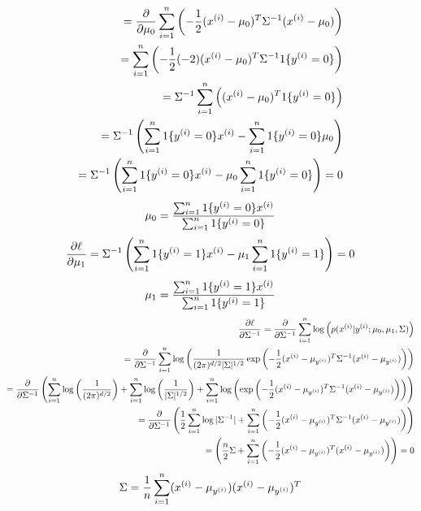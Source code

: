 \begin{answer}
\begin{eqnarray*}
=\frac{\partial}{\partial\mu_{0}}\sum_{i=1}^{n} \left(-\frac{1}{2}(x^{(i)}-\mu_{0})^T \Sigma^{-1} (x^{(i)}-\mu_{0})\right) \\
=\sum_{i=1}^{n} \left(-\frac{1}{2}(-2)(x^{(i)}-\mu_{0})^T \Sigma^{-1}1\{y^{(i)} = 0\}\right) \\
=\Sigma^{-1}\sum_{i=1}^{n} \left((x^{(i)}-\mu_{0})^T 1\{y^{(i)} = 0\}\right) \\
=\Sigma^{-1}\left(\sum_{i=1}^{n}  1\{y^{(i)} = 0\}x^{(i)}-\sum_{i=1}^{n} 1\{y^{(i)} = 0\}\mu_{0}\right) \\
=\Sigma^{-1}\left(\sum_{i=1}^{n} 1\{y^{(i)} = 0\}x^{(i)}-\mu_{0}\sum_{i=1}^{n} 1\{y^{(i)} = 0\}\right)=0
  \end{eqnarray*}
  \begin{eqnarray*}
\mu_0=\frac{\sum_{i=1}^{n} 1\{y^{(i)} = {0}\} x^{(i)}}{\sum_{i=1}^{n}1\{y^{(i)} = {0}\}}
  \end{eqnarray*}
  \begin{eqnarray*}
\frac{\partial\ell}{\partial\mu_{1}}=\Sigma^{-1}\left(\sum_{i=1}^{n} 1\{y^{(i)} = 1\}x^{(i)}-\mu_{1}\sum_{i=1}^{n} 1\{y^{(i)} = 1\}\right)=0
  \end{eqnarray*}
  \begin{eqnarray*}
\mu_1=\frac{\sum_{i=1}^{n} 1\{y^{(i)} = {1}\} x^{(i)}}{\sum_{i=1}^{n}1\{y^{(i)} = {1}\}}
  \end{eqnarray*}
  \begin{eqnarray*}
\frac{\partial\ell}{\partial\Sigma^{-1}}=\frac{\partial}{\partial\Sigma^{-1}}\sum_{i=1}^{n} \log \left( p(x^{(i)} | y^{(i)}; \mu_{0}, \mu_1, \Sigma) \right)\\
=\frac{\partial}{\partial\Sigma^{-1}}\sum_{i=1}^{n} \log \left(\frac{1}{(2\pi)^{{d}/2} |\Sigma|^{1/2}}\exp\left(-\frac{1}{2}(x^{(i)}-\mu_{y^{(i)}})^T \Sigma^{-1} (x^{(i)}-\mu_{y^{(i)}})\right) \right)\\
=\frac{\partial}{\partial\Sigma^{-1}}\left(\sum_{i=1}^{n} \log \left(\frac{1}{(2\pi)^{{d}/2}}\right)+\sum_{i=1}^{n} \log \left(\frac{1}{|\Sigma|^{1/2}}\right)+\sum_{i=1}^{n} \log\left(\exp\left(-\frac{1}{2}(x^{(i)}-\mu_{y^{(i)}})^T \Sigma^{-1} (x^{(i)}-\mu_{y^{(i)}})\right) \right)\right)\\
=\frac{\partial}{\partial\Sigma^{-1}}\left(\frac{1}{2}\sum_{i=1}^{n} \log|\Sigma^{-1}|+\sum_{i=1}^{n} \left(-\frac{1}{2}(x^{(i)}-\mu_{y^{(i)}})^T \Sigma^{-1} (x^{(i)}-\mu_{y^{(i)}})\right)\right)\\
=\left(\frac{{n}}{2}\Sigma+\sum_{i=1}^{n} \left(-\frac{1}{2}(x^{(i)}-\mu_{y^{(i)}})^T(x^{(i)}-\mu_{y^{(i)}})\right)\right)=0
  \end{eqnarray*}
  \begin{eqnarray*}
\Sigma=\frac{1}{{n}} \sum_{i=1}^{n} (x^{(i)} - \mu_{y^{(i)}}) (x^{(i)} -\mu_{y^{(i)}})^T
  \end{eqnarray*}
\end{answer}
